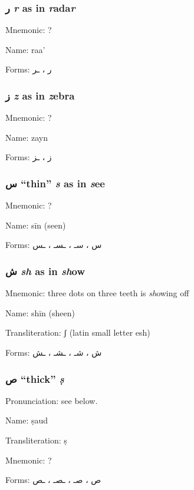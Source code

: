 \documentclass[11pt]{article}
\begin{document}
\subsubsection{ \textarabic{ر} \textit{r} as in \textit{r}ada\textit{r}}
Mnemonic:  ?

\noindent Name: raa'

\noindent Forms: \textarabic{ر ، ـر}

\subsubsection{ \textarabic{ز} \textit{z} as in \textit{z}ebra}
Mnemonic:  ?

\noindent Name: zayn

\noindent Forms: \textarabic{ز ، ـز}

\subsubsection{ \textarabic{س} ``thin'' \textit{s} as in \textit{s}ee}
Mnemonic:  ?

\noindent Name: sīn (seen)

\noindent Forms: \textarabic{س ، سـ ، ـسـ ، ـس}

\subsubsection{ \textarabic{ش} \textit{sh} as in \textit{sh}ow}
Mnemonic:  three dots on three teeth is \textit{sh}owing off

\noindent Name: shīn (sheen)

\noindent Transliteration: ʃ (latin small letter esh)

\noindent Forms: \textarabic{ش ، شـ ، ـشـ ، ـش}

\subsubsection{ \textarabic{ص} ``thick'' \textit{ṣ}}
Pronunciation: see below.

\noindent Name: ṣaud

\noindent Transliteration: ṣ

\noindent Mnemonic:  ?

\noindent Forms: \textarabic{ص ، صـ ، ـصـ ، ـص}

\end{document}
